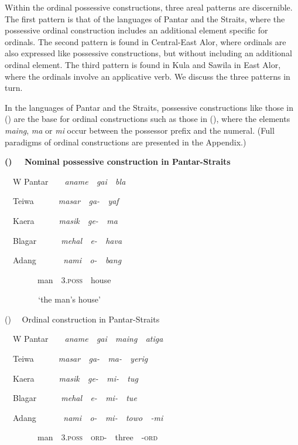 Within the ordinal possessive constructions, three areal patterns are discernible. The first pattern is that of the languages of Pantar and the Straits, where the possessive ordinal construction includes an additional element specific for ordinals. The second pattern is found in Central-East Alor, where ordinals are also expressed like possessive constructions, but without including an additional ordinal element. The third pattern is found in Kula and Sawila in East Alor, where the ordinals involve an applicative verb. We discuss the three patterns in turn.

In the languages of Pantar and the Straits, possessive constructions like those in () are the base for ordinal constructions such as those in (), where the elements \textit{maing},\textit{ ma }or \textit{mi }occur between the possessor prefix and the numeral. (Full paradigms of ordinal constructions are presented in the Appendix.) 

{\bfseries
\label{bkm:Ref342649616}\textmd{(}\textmd{)}\textmd{ \ \ Nominal possessive construction }\textmd{in Pantar-Straits}}

\ \ W Pantar\ \ \ \ \textit{aname\ \ gai\ \ bla}

\ \ Teiwa\ \ \ \ \ \ \textit{masar\ \ ga-\ \ yaf}

\ \ Kaera\ \ \ \ \ \ \textit{masik\ \ ge-\ \ ma}

\ \ Blagar\ \ \ \ \ \ \textit{mehal\ \ }\textit{{\textglotstop}}\textit{e-\ \ hava}

\ \ Adang \ \ \ \ \ \ \textit{nami\ \ o-\ \ bang}

\ \ \ \ \ \ \ \ man\ \ \textsc{3.poss}\ \ house\ \ 

\textit{\ \ \ \ \ \ \ \ }{\textquoteleft}the man{\textquoteright}s house{\textquoteright}\ \ 

\clearpage
\label{bkm:Ref342649632}() \ \ Ordinal construction in Pantar-Straits 

\ \ W Pantar\ \ \ \ \textit{aname\ \ gai\ \ maing\ \ atiga}

\ \ Teiwa\ \ \ \ \ \ \textit{masar\ \ ga-\ \ ma-\ \ yerig}

\ \ Kaera\ \ \ \ \ \ \textit{masik\ \ ge-\ \ mi-\ \ tug}

\ \ Blagar\ \ \ \ \ \ \textit{mehal\ \ }\textit{{\textglotstop}}\textit{e-\ \ mi-\ \ tue}

\ \ Adang \ \ \ \ \ \ \textit{nami\ \ o-\ \ mi-\ \ towo\ \ {}-mi}

\ \ \ \ \ \ \ \ man\ \ \textsc{3.poss\ \ ord-\ \ }three\ \ {}-\textsc{ord}

